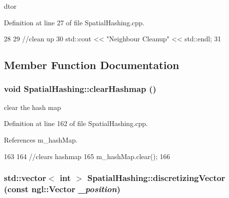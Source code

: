 dtor 



Definition at line 27 of file SpatialHashing.cpp.




\begin{DoxyCode}
28 {
29     //clean up
30     std::cout << "Neighbour Cleanup" << std::endl;
31 }
\end{DoxyCode}




\subsection{Member Function Documentation}
\hypertarget{class_spatial_hashing_a58638653aed1d4d304c6e2aa839ba9ba}{
\subsubsection[{clearHashmap}]{\setlength{\rightskip}{0pt plus 5cm}void SpatialHashing::clearHashmap ()}}
\label{class_spatial_hashing_a58638653aed1d4d304c6e2aa839ba9ba}


clear the hash map 



Definition at line 162 of file SpatialHashing.cpp.



References m\_\-hashMap.




\begin{DoxyCode}
163 {
164     //clears hashmap
165     m_hashMap.clear();
166 }
\end{DoxyCode}


\hypertarget{class_spatial_hashing_addbd2cd5fde1521533a54ade79787dde}{
\subsubsection[{discretizingVector}]{\setlength{\rightskip}{0pt plus 5cm}std::vector$<$ int $>$ SpatialHashing::discretizingVector (const ngl::Vector {\em \_\-position})}}
\label{class_spatial_hashing_addbd2cd5fde1521533a54ade79787dde}


